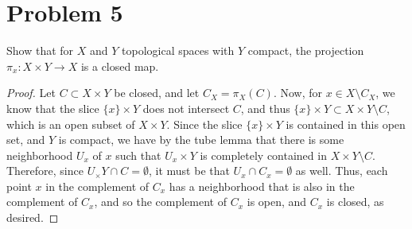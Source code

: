 \documentclass[fontsize=11pt]{scrartcl} %
\numberwithin{equation}{section} %
\numberwithin{figure}{section} %
\numberwithin{table}{section} %
\begin{document}
\section*{Problem 5}
Show that for $X$ and $Y$ topological spaces with $Y$ compact, the projection
$\pi_x:X\times Y\to X$ is a closed map.
\\
\begin{proof}
    Let $C\subset X\times Y$ be closed, and let $C_X = \pi_X(C)$. Now, for $x\in
    X\setminus C_X$, we know that the slice $\{x\}\times Y$ does not intersect
    $C$, and thus $\{x\}\times Y\subset X\times Y\setminus C$, which is an open
    subset of $X\times Y$. Since the slice $\{x\}\times Y$ is contained in this
    open set, and $Y$ is compact, we have by the tube lemma that there is some
    neighborhood $U_x$ of $x$ such that $U_x\times Y$ is completely contained in
    $X\times Y\setminus C$. Therefore, since $U_\times Y\cap C = \emptyset$, it
    must be that $U_x\cap C_x = \emptyset$ as well. Thus, each point $x$ in the
    complement of $C_x$ has a neighborhood that is also in the complement of
    $C_x$, and so the complement of $C_x$ is open, and $C_x$ is closed, as
    desired.
\end{proof}
\end{document}
